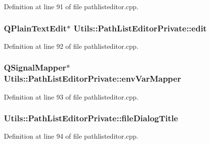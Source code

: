 Definition at line 91 of file pathlisteditor.\-cpp.

\hypertarget{struct_utils_1_1_path_list_editor_private_a31a2699dec0693dade54946d3793241e}{
\subsubsection[{edit}]{\setlength{\rightskip}{0pt plus 5cm}Q\-Plain\-Text\-Edit$\ast$ Utils\-::\-Path\-List\-Editor\-Private\-::edit}}\label{struct_utils_1_1_path_list_editor_private_a31a2699dec0693dade54946d3793241e}


Definition at line 92 of file pathlisteditor.\-cpp.

\hypertarget{struct_utils_1_1_path_list_editor_private_a20a73b993eb36ec2ecd25527d274f962}{
\subsubsection[{env\-Var\-Mapper}]{\setlength{\rightskip}{0pt plus 5cm}Q\-Signal\-Mapper$\ast$ Utils\-::\-Path\-List\-Editor\-Private\-::env\-Var\-Mapper}}\label{struct_utils_1_1_path_list_editor_private_a20a73b993eb36ec2ecd25527d274f962}


Definition at line 93 of file pathlisteditor.\-cpp.

\hypertarget{struct_utils_1_1_path_list_editor_private_a7f99e038e914397b7afcb6d35eff0142}{
\subsubsection[{file\-Dialog\-Title}]{ Utils\-::\-Path\-List\-Editor\-Private\-::file\-Dialog\-Title}}\label{struct_utils_1_1_path_list_editor_private_a7f99e038e914397b7afcb6d35eff0142}


Definition at line 94 of file pathlisteditor.\-cpp.

